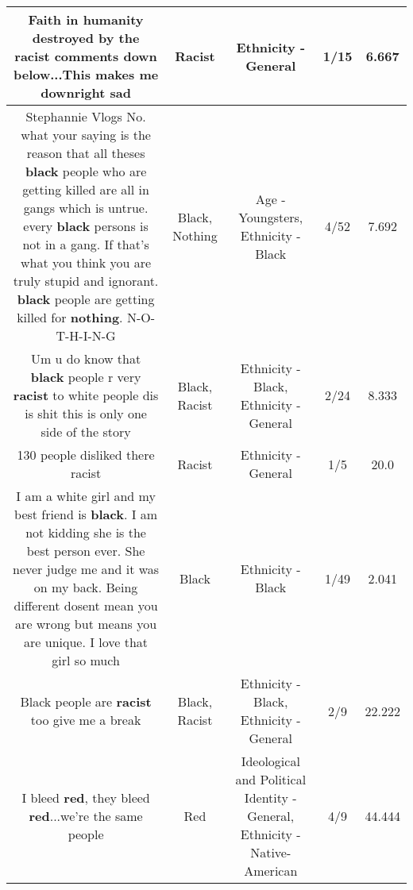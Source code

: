 \documentclass[11pt]{article}
\newlength\mylength
\begin{document}
\begin{center}
\begin{longtable}{|C{.65\mylength}|C{.30\mylength}|C{.12\mylength}|C{.12\mylength}|C{.12\mylength}|}
  \small Faith in humanity destroyed by the \textbf{racist} comments down below...This makes me downright sad\normalsize   & Racist & Ethnicity - General & 1/15 & 6.667 \\  \hline
  \small Stephannie Vlogs No. what your saying is the reason that all theses \textbf{black} people who are getting killed are all in gangs which is untrue. every \textbf{black} persons is not in a gang. If that's what you think you are truly stupid and ignorant. \textbf{black} people are getting killed for \textbf{nothing}. N-O-T-H-I-N-G\normalsize   & Black, Nothing & Age - Youngsters, Ethnicity - Black & 4/52 & 7.692 \\  \hline
  \small Um u do know that \textbf{black} people r very \textbf{racist} to white people dis is shit this is only one side of the story\normalsize   & Black, Racist & Ethnicity - Black, Ethnicity - General & 2/24 & 8.333 \\  \hline
  \small 130 people disliked there racist\normalsize   & Racist & Ethnicity - General & 1/5 & 20.0 \\  \hline
  \small I am a white girl and my best friend is \textbf{black}. I am not kidding she is the best person ever. She never judge me and it was on my back. Being different dosent mean you are wrong but means you are unique. I love that girl so much\normalsize   & Black & Ethnicity - Black & 1/49 & 2.041 \\  \hline
  \small Black people are \textbf{racist} too give me a break\normalsize   & Black, Racist & Ethnicity - Black, Ethnicity - General & 2/9 & 22.222 \\  \hline
  \small I bleed \textbf{r\textbf{ed}}, they bleed \textbf{r\textbf{ed}}...we're the same people\normalsize   & Red &  Ideological and Political Identity - General, Ethnicity - Native-American & 4/9 & 44.444 \\  \hline

\end{longtable}
\end{center}
\end{document}
